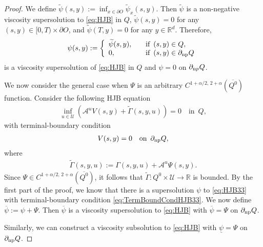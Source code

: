 \documentclass[amscd,amssymb,11pt]{article}
\numberwithin{theorem}{section}
\numberwithin{equation}{section}
\begin{document}
\begin{proof}
We define $\widetilde{\psi}(s,y):=\inf_{x\in\partial O}\widetilde{\psi}_{x}(s,y)$. Then $\widetilde{\psi}$ is a non-negative viscosity supersolution to \eqref{eq:HJB} in $Q$, $\widetilde{\psi}(s,y)=0$ for any $(s,y)\in[0,T)\times\partial O$, and $\widetilde{\psi}(T,y)=0$ for any $y\in\mathbb{R}^{d}$. Therefore,
\begin{equation*}
\psi(s,y):=\left\{\begin{array}{ll} \widetilde{\psi}(s,y),\quad &\text{if }\,(s,y)\in Q, \\ 0,\quad &\text{if }\,(s,y)\in\partial_{{\rm np}}Q \end{array}\right.
\end{equation*}
is a viscosity supersolution of \eqref{eq:HJB} in $Q$ and $\psi=0$ on $\partial_{{\text np}}Q$.

We now consider the general case when $\Psi$ is an arbitrary $C^{1+\alpha/2,\,2+\alpha}(\overline{Q^{0}})$ function. Consider the following HJB equation
\begin{align}\label{eq:HJB33}
\inf_{u\in\mathcal{U}}(\mathscr{A}^{u}V(s,y)+\widetilde{\Gamma}(s,y,u))=0\quad\text{in }\,Q,
\end{align}
with terminal-boundary condition
\begin{align}\label{eq:TermBoundCondHJB33}
V(s,y)=0\quad\text{on }\,\partial_{{\rm np}}Q,
\end{align}
where
\begin{align*}
\widetilde{\Gamma}(s,y,u):=\Gamma(s,y,u)+\mathscr{A}^{u}\Psi(s,y).
\end{align*}
Since $\Psi\in C^{1+\alpha/2,\,2+\alpha}(\overline{Q^{0}})$, it follows that $\widetilde{\Gamma}:Q^{0}\times \mathcal{U}\rightarrow\mathbb{R}$ is bounded. By the first part of the proof, we know that there is a supersolution $\psi$ to \eqref{eq:HJB33} with terminal-boundary condition \eqref{eq:TermBoundCondHJB33}. We now define $\overline{\psi}:=\psi+\Psi$. Then $\overline{\psi}$ is a viscosity supersolution to \eqref{eq:HJB} with $\overline{\psi}=\Psi$ on $\partial_{{\rm np}}Q$.

Similarly, we can construct a viscosity subsolution to \eqref{eq:HJB} with $\underline{\psi}=\Psi$ on $\partial_{\rm np}Q$.
\end{proof}
\end{document}
